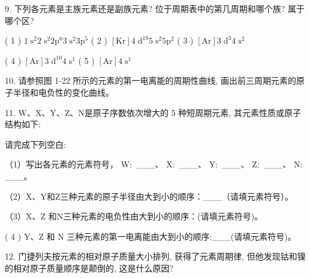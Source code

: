 \documentclass[10pt]{article}
\begin{document}
9. 下列各元素是主族元素还是副族元素? 位于周期表中的第几周期和哪个族? 属于哪个区?

( 1 ) \(1{\mathrm{\;s}}^{2}2{\mathrm{\;s}}^{2}2{\mathrm{p}}^{6}3{\mathrm{\;s}}^{2}3{\mathrm{p}}^{5}\) ( 2 ) \(\left\lbrack \mathrm{{Kr}}\right\rbrack 4{\mathrm{\;d}}^{10}5{\mathrm{\;s}}^{2}5{\mathrm{p}}^{2}\) ( 3 ) \(\left\lbrack \mathrm{{Ar}}\right\rbrack 3{\mathrm{\;d}}^{3}4{\mathrm{\;s}}^{2}\)

( 4 ) \(\left\lbrack \mathrm{{Ar}}\right\rbrack 3{\mathrm{\;d}}^{10}4{\mathrm{\;s}}^{1}\) ( 5 ) \(\left\lbrack \mathrm{{Ar}}\right\rbrack 4{\mathrm{\;s}}^{1}\)

10. 请参照图 1-22 所示的元素的第一电离能的周期性曲线, 画出前三周期元素的原子半径和电负性的变化曲线。

11. W、X、Y、Z、N是原子序数依次增大的 5 种短周期元素, 其元素性质或原子结构如下:

\begin{center}
\end{center}

请完成下列空白:

（1）写出各元素的元素符号， \(\mathrm{W} :\) \_\_\_、 \(\mathrm{X} :\) \_\_\_、 \(\mathrm{Y} :\) \_\_\_、 \(\mathrm{Z} :\) \_\_\_、 \(\mathrm{N} :\) \_\_\_。

（2）X、Y和Z三种元素的原子半径由大到小的顺序：\_\_\_（请填元素符号）。

（3）X、Z 和N三种元素的电负性由大到小的顺序：(请填元素符号)。

( 4 ) \(\mathrm{Y}\text{、}\mathrm{Z}\) 和 \(\mathrm{N}\) 三种元素的第一电离能由大到小的顺序:\_\_\_(请填元素符号)。

12. 门捷列夫按元素的相对原子质量大小排列, 获得了元素周期律, 但他发现钴和镍的相对原子质量顺序是颠倒的, 这是什么原因?
\end{document}
